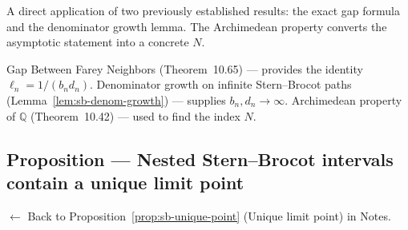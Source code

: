 \begin{remark*}
A direct application of two previously established results: the exact
gap formula and the denominator growth lemma.  The Archimedean property
converts the asymptotic statement into a concrete $N$.
\end{remark*}

\begin{remark*}[Dependencies]
Gap Between Farey Neighbors (Theorem~10.65) --- provides the identity
$\ell_n = 1/(b_n d_n)$. Denominator growth on infinite Stern--Brocot
paths (Lemma~\ref{lem:sb-denom-growth}) --- supplies $b_n, d_n \to \infty$.
Archimedean property of $\mathbb{Q}$ (Theorem~10.42) --- used to find
the index $N$.
\end{remark*}



\subsection*{Proposition --- Nested Stern--Brocot intervals contain a unique limit point}
\label{prf:sb-unique-point}

\begin{remark*}[Return]
$\leftarrow$ Back to Proposition~\ref{prop:sb-unique-point} (Unique limit point) in Notes.
\end{remark*}

